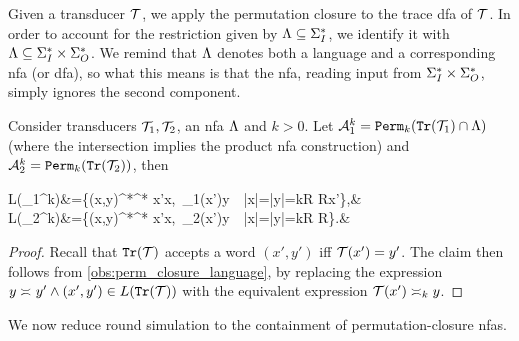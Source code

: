 Given a transducer $\cT$, we apply the permutation closure to the trace \gls{dfa} of $\cT$. In order to account for the restriction given by $\fL\subseteq \sI^*$, we identify it with $\fL \subseteq \sI^*\times \sO^*$. We remind that $\fL$ denotes both a language and a corresponding \gls{nfa} (or \gls{dfa}), so what this means is that the \gls{nfa}, reading input from $\sI^*\times \sO^*$, simply ignores the second component.
\begin{lemma}
	\label{lem:permutation_closure_construction}
	Consider transducers $\cT_1,\cT_2$, an \gls{nfa} $\fL$ and $k>0$. Let $\cA_1^k=\perm_k(\tr(\cT_1)\cap \fL)$ (where the intersection implies the product \gls{nfa} construction) and $\cA_2^k=\perm_k(\tr(\cT_2))$, then
	\begin{flalign*}
	L(\cA_1^k)&=\{(x,y)\in \sI^*\times \sO^* \ST \exists x'\req[k] x,\ \cT_1(x')\req[k] y\ \wedge\ |x|=|y|=kR R\in \bbN \wedge x'\in \fL\},&\\
	L(\cA_2^k)&=\{(x,y)\in \sI^*\times \sO^* \ST \exists x'\req[k] x,\ \cT_2(x')\req[k] y\ \wedge\ |x|=|y|=kR R\in \bbN\}.&
	\end{flalign*}
\end{lemma}
\begin{proof}
	Recall that $\tr(\cT)$ accepts a word $(x',y')$ iff $\cT(x')=y'$. The claim then follows from \autoref{obs:perm_closure_language}, by replacing the expression $y\req y' \wedge (x',y')\in L(\tr(\cT))$ with the equivalent expression $\cT(x')\req[k] y$.
\end{proof}

We now reduce round simulation to the containment of permutation-closure \glspl{nfa}.

